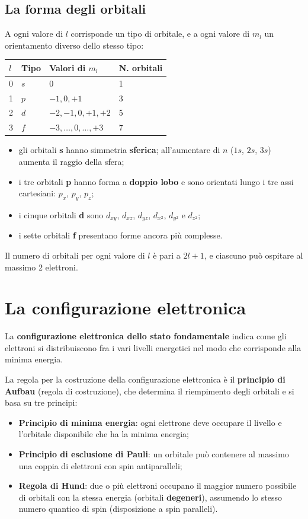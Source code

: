 \documentclass[11pt, a4paper, openright]{book}
\begin{document}
\subsection{La forma degli orbitali}
A ogni valore di $l$ corrisponde un tipo di orbitale, e a ogni valore di $m_l$ un orientamento diverso dello stesso tipo:

\begin{center}
\begin{tabular}{llll}
\toprule
$l$ & \textbf{Tipo} & \textbf{Valori di $m_l$} & \textbf{N. orbitali} \\
\midrule
0 & $s$ & 0 & 1 \\
1 & $p$ & $-1, 0, +1$ & 3 \\
2 & $d$ & $-2, -1, 0, +1, +2$ & 5 \\
3 & $f$ & $-3, \dots, 0, \dots, +3$ & 7 \\
\bottomrule
\end{tabular}
\end{center}

\begin{itemize}
    \item gli orbitali \textbf{s} hanno simmetria \textbf{sferica}; all'aumentare di $n$ ($1s$, $2s$, $3s$) aumenta il raggio della sfera;
    \item i tre orbitali \textbf{p} hanno forma a \textbf{doppio lobo} e sono orientati lungo i tre assi cartesiani: $p_x$, $p_y$, $p_z$;
    \item i cinque orbitali \textbf{d} sono $d_{xy}$, $d_{xz}$, $d_{yz}$, $d_{x^2}$, $d_{y^2}$ e $d_{z^2}$;
    \item i sette orbitali \textbf{f} presentano forme ancora più complesse.
\end{itemize}
Il numero di orbitali per ogni valore di $l$ è pari a $2l+1$, e ciascuno può ospitare al massimo 2 elettroni.

\newpage

\section{La configurazione elettronica}
La \textbf{configurazione elettronica dello stato fondamentale} indica come gli elettroni si distribuiscono fra i vari livelli energetici nel modo che corrisponde alla minima energia.

La regola per la costruzione della configurazione elettronica è il \textbf{principio di Aufbau} (regola di costruzione), che determina il riempimento degli orbitali e si basa su tre principi:
\begin{itemize}
    \item \textbf{Principio di minima energia}: ogni elettrone deve occupare il livello e l'orbitale disponibile che ha la minima energia;
    \item \textbf{Principio di esclusione di Pauli}: un orbitale può contenere al massimo una coppia di elettroni con spin antiparalleli;
    \item \textbf{Regola di Hund}: due o più elettroni occupano il maggior numero possibile di orbitali con la stessa energia (orbitali \textbf{degeneri}), assumendo lo stesso numero quantico di spin (disposizione a spin paralleli).
\end{itemize}
\end{document}

